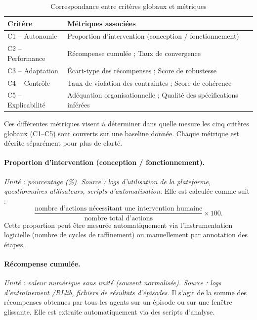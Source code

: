 \begin{table}[h!]
  \centering
  \caption{Correspondance entre critères globaux et métriques}
  \begin{tabular}{|l|l|}
    \hline
    \textbf{Critère}   & \textbf{Métriques associées}                                       \\
    \hline
    C1 – Autonomie     & Proportion d’intervention (conception / fonctionnement)            \\
    \hline
    C2 – Performance   & Récompense cumulée ; Taux de convergence                           \\
    \hline
    C3 – Adaptation    & Écart-type des récompenses ; Score de robustesse                   \\
    \hline
    C4 – Contrôle      & Taux de violation des contraintes ; Score de cohérence             \\
    \hline
    C5 – Explicabilité & Adéquation organisationnelle ; Qualité des spécifications inférées \\
    \hline
  \end{tabular}
  \label{tab:grille}
\end{table}

Ces différentes métriques visent à déterminer dans quelle mesure les cinq critères globaux (C1--C5) sont couverts sur une baseline donnée.
Chaque métrique est décrite séparément pour plus de clarté.

\paragraph{Proportion d’intervention (conception / fonctionnement).}
\textit{Unité : pourcentage (\%). Source : logs d’utilisation de la plateforme, questionnaires utilisateurs, scripts d’automatisation.}
Elle est calculée comme suit :
\[
  \frac{\text{nombre d’actions nécessitant une intervention humaine}}{\text{nombre total d’actions}} \times 100.
\]
Cette proportion peut être mesurée automatiquement via l’instrumentation logicielle (nombre de cycles de raffinement) ou manuellement par annotation des étapes.

\paragraph{Récompense cumulée.}
\textit{Unité : valeur numérique sans unité (souvent normalisée). Source : logs d’entraînement /RLlib, fichiers de résultats d’épisodes.}
Il s’agit de la somme des récompenses obtenues par tous les agents sur un épisode ou sur une fenêtre glissante.
Elle est extraite automatiquement via des scripts d’analyse.

